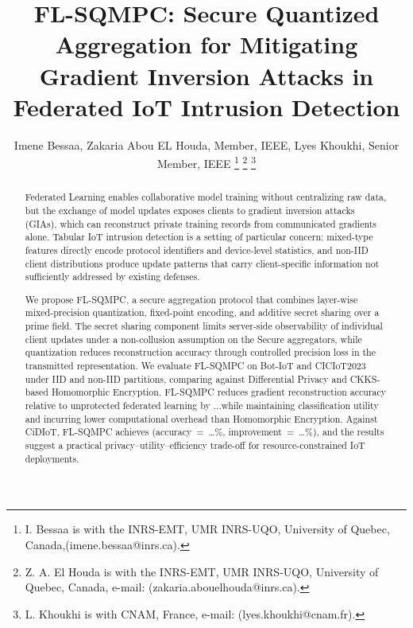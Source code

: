 \documentclass[journal,twoside,web]{ieeecolor}
\begin{document}
\title{FL-SQMPC: Secure Quantized Aggregation for Mitigating Gradient Inversion Attacks in Federated IoT Intrusion Detection}
\author{Imene Bessaa, Zakaria Abou EL Houda,  Member, IEEE, Lyes Khoukhi, Senior Member, IEEE
\thanks{ I. Bessaa is with the INRS-EMT, UMR INRS-UQO, University of Quebec, Canada,(imene.bessaa@inrs.ca).}
\thanks{Z. A. El Houda is with the INRS-EMT, UMR INRS-UQO, University of Quebec, Canada, e-mail: (zakaria.abouelhouda@inrs.ca).}
\thanks{L. Khoukhi is with CNAM, France, e-mail: (lyes.khoukhi@cnam.fr).}
}  

\maketitle

\begin{abstract}


\begin{abstract}
Federated Learning enables collaborative model training without centralizing raw data, but the exchange of model updates exposes clients to gradient inversion attacks (GIAs), which can reconstruct private training records from communicated gradients alone. Tabular IoT intrusion detection is a setting of particular concern: mixed-type features directly encode protocol identifiers and device-level statistics, and non-IID client distributions produce update patterns that carry client-specific information not sufficiently addressed by existing defenses.

We propose FL-SQMPC, a secure aggregation protocol that combines layer-wise mixed-precision quantization, fixed-point encoding, and additive secret sharing over a prime field. The secret sharing component limits server-side observability of individual client updates under a non-collusion assumption on the Secure aggregators, while quantization reduces reconstruction accuracy through controlled precision loss in the transmitted representation.
We evaluate FL-SQMPC on Bot-IoT and CICIoT2023 under IID and non-IID partitions, comparing against Differential Privacy and CKKS-based Homomorphic Encryption. FL-SQMPC reduces gradient reconstruction accuracy relative to unprotected federated learning by ...while maintaining classification utility and incurring lower computational overhead than Homomorphic Encryption. Against CiDIoT, FL-SQMPC achieves (accuracy~=~\ldots\%, improvement~=~\ldots\%), and the
results suggest a practical privacy--utility--efficiency trade-off for resource-constrained IoT deployments.
\end{abstract}



\end{abstract}
\end{document}
